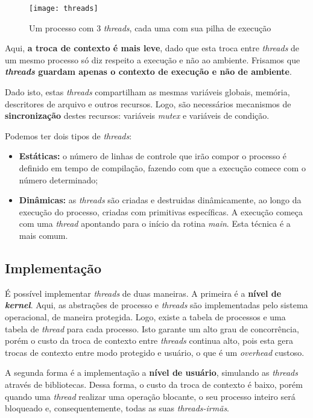 \begin{figure}[h]
  \centering
  \texttt{[image: threads]}
  \caption{Um processo com 3 \textit{threads}, cada uma com sua pilha de execução}
  \label{fig:threads}
\end{figure}

Aqui, \textbf{a troca de contexto é mais leve}, dado que esta troca entre \textit{threads} de um mesmo processo só diz respeito a execução e não ao ambiente. Frisamos que \textbf{\textit{threads} guardam apenas o contexto de execução e não de ambiente}.

Dado isto, estas \textit{threads} compartilham as mesmas variáveis globais, memória, descritores de arquivo e outros recursos. Logo, são necessários mecanismos de \textbf{sincronização} destes recursos: variáveis \textit{mutex} e variáveis de condição.

Podemos ter dois tipos de \textit{threads}:
\begin{itemize}
  \item \textbf{Estáticas:} o número de linhas de controle que irão compor o processo é definido em tempo de compilação, fazendo com que a execução comece com o número determinado;

  \item \textbf{Dinâmicas:} as \textit{threads} são criadas e destruidas dinâmicamente, ao longo da execução do processo, criadas com primitivas específicas. A execução começa com uma \textit{thread} apontando para o início da rotina \textit{main}. Esta técnica é a mais comum.
\end{itemize}






\subsection{Implementação}
É possível implementar \textit{threads} de duas maneiras. A primeira é a \textbf{nível de \textit{kernel}}. Aqui, as abstrações de processo e \textit{threads} são implementadas pelo sistema operacional, de maneira protegida. Logo, existe a tabela de processos e uma tabela de \textit{thread} para cada processo. Isto garante um alto grau de concorrência, porém o custo da troca de contexto entre \textit{threads} continua alto, pois esta gera trocas de contexto entre modo protegido e usuário, o que é um \textit{overhead} custoso.

A segunda forma é a implementação a \textbf{nível de usuário}, simulando as \textit{threads} através de bibliotecas. Dessa forma, o custo da troca de contexto é baixo, porém quando uma \textit{thread} realizar uma operação blocante, o seu processo inteiro será bloqueado e, consequentemente, todas as suas \textit{threads-irmãs}.







